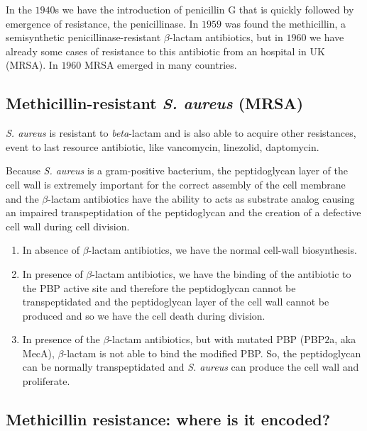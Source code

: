In the $1940$s we have the introduction of penicillin G that is quickly followed by emergence of resistance, the penicillinase. 
In $1959$ was found the methicillin, a semisynthetic penicillinase-resistant $\beta$-lactam antibiotics, but in $1960$ we have already some cases of resistance to this antibiotic from an hospital in UK (MRSA). In $1960$ MRSA emerged in many countries. 

\subsection{Methicillin-resistant \emph{S. aureus} (MRSA)}

\emph{S. aureus} is resistant to \emph{beta}-lactam and is also able to acquire other resistances, event to last resource antibiotic, like vancomycin, linezolid, daptomycin.

Because \emph{S. aureus} is a gram-positive bacterium, the peptidoglycan layer of the cell wall is extremely important for the correct assembly of the cell membrane and the $\beta$-lactam antibiotics have the ability to acts as substrate analog causing an impaired transpeptidation of the peptidoglycan and the creation of a defective cell wall during cell division.

\begin{enumerate}
    \item In absence of $\beta$-lactam antibiotics, we have the normal cell-wall biosynthesis.
    \item In presence of $\beta$-lactam antibiotics, we have the binding of the antibiotic to the PBP active site and therefore the peptidoglycan cannot be transpeptidated and the peptidoglycan layer of the cell wall cannot be produced and so we have the cell death during division. 
    \item In presence of the $\beta$-lactam antibiotics, but with mutated PBP (PBP$2$a, aka MecA), $\beta$-lactam is not able to bind the modified PBP. So, the peptidoglycan can be normally transpeptidated and \emph{S. aureus} can produce the cell wall and proliferate. 
\end{enumerate}

\subsection{Methicillin resistance: where is it encoded?}

